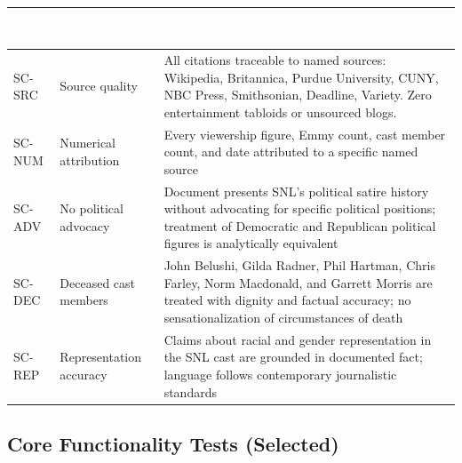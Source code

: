 \documentclass[11pt,letterpaper]{article}
\newcommand{\tableheader}[1]{\textbf{\sffamily\textcolor{white}{#1}}}
\begin{document}
\begin{center}
\begin{tabularx}{\textwidth}{L{1.5cm}L{3cm}X}
\toprule
{}
\tableheader{Test ID} & \tableheader{Verifies} & \tableheader{Expected Behavior} \\
\midrule
SC-SRC & Source quality & All citations traceable to named sources: Wikipedia, Britannica, Purdue University, CUNY, NBC Press, Smithsonian, Deadline, Variety. Zero entertainment tabloids or unsourced blogs. \\
SC-NUM & Numerical attribution & Every viewership figure, Emmy count, cast member count, and date attributed to a specific named source \\
SC-ADV & No political advocacy & Document presents SNL's political satire history without advocating for specific political positions; treatment of Democratic and Republican political figures is analytically equivalent \\
SC-DEC & Deceased cast members & John Belushi, Gilda Radner, Phil Hartman, Chris Farley, Norm Macdonald, and Garrett Morris are treated with dignity and factual accuracy; no sensationalization of circumstances of death \\
SC-REP & Representation accuracy & Claims about racial and gender representation in the SNL cast are grounded in documented fact; language follows contemporary journalistic standards \\
\bottomrule
\end{tabularx}
\end{center}

\subsection{Core Functionality Tests (Selected)}
\end{document}
